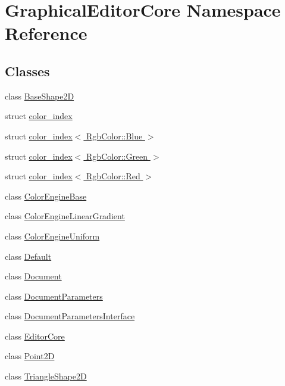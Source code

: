 \hypertarget{namespaceGraphicalEditorCore}{}\section{Graphical\+Editor\+Core Namespace Reference}
\label{namespaceGraphicalEditorCore}
\subsection*{Classes}
\begin{DoxyCompactItemize}
\item 
class \hyperlink{classGraphicalEditorCore_1_1BaseShape2D}{Base\+Shape2D}
\item 
struct \hyperlink{structGraphicalEditorCore_1_1color__index}{color\+\_\+index}
\item 
struct \hyperlink{structGraphicalEditorCore_1_1color__index_3_01RgbColor_1_1Blue_01_4}{color\+\_\+index$<$ Rgb\+Color\+::\+Blue $>$}
\item 
struct \hyperlink{structGraphicalEditorCore_1_1color__index_3_01RgbColor_1_1Green_01_4}{color\+\_\+index$<$ Rgb\+Color\+::\+Green $>$}
\item 
struct \hyperlink{structGraphicalEditorCore_1_1color__index_3_01RgbColor_1_1Red_01_4}{color\+\_\+index$<$ Rgb\+Color\+::\+Red $>$}
\item 
class \hyperlink{classGraphicalEditorCore_1_1ColorEngineBase}{Color\+Engine\+Base}
\item 
class \hyperlink{classGraphicalEditorCore_1_1ColorEngineLinearGradient}{Color\+Engine\+Linear\+Gradient}
\item 
class \hyperlink{classGraphicalEditorCore_1_1ColorEngineUniform}{Color\+Engine\+Uniform}
\item 
class \hyperlink{classGraphicalEditorCore_1_1Default}{Default}
\item 
class \hyperlink{classGraphicalEditorCore_1_1Document}{Document}
\item 
class \hyperlink{classGraphicalEditorCore_1_1DocumentParameters}{Document\+Parameters}
\item 
class \hyperlink{classGraphicalEditorCore_1_1DocumentParametersInterface}{Document\+Parameters\+Interface}
\item 
class \hyperlink{classGraphicalEditorCore_1_1EditorCore}{Editor\+Core}
\item 
class \hyperlink{classGraphicalEditorCore_1_1Point2D}{Point2D}
\item 
class \hyperlink{classGraphicalEditorCore_1_1TriangleShape2D}{Triangle\+Shape2D}
\end{DoxyCompactItemize}
